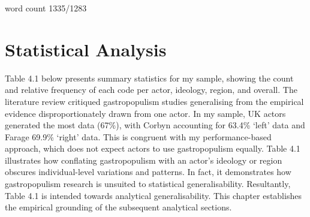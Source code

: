 \documentclass[a4paper, nobind]{templates/ociamthesis}
\begin{document}
\begin{romanpages}







\dominitoc %

\flushbottom




\end{romanpages}

\flushbottom

{word count 1335/1283}

\hypertarget{statistical-analysis}{%
\chapter{Statistical Analysis}\label{statistical-analysis}}

Table 4.1 below presents summary statistics for my sample, showing the count and relative frequency of each code per actor, ideology, region, and overall. The literature review critiqued gastropopulism studies generalising from the empirical evidence disproportionately drawn from one actor. In my sample, UK actors generated the most data (67\%), with Corbyn accounting for 63.4\% `left' data and Farage 69.9\% `right' data. This is congruent with my performance-based approach, which does not expect actors to use gastropopulism equally. Table 4.1 illustrates how conflating gastropopulism with an actor's ideology or region obscures individual-level variations and patterns. In fact, it demonstrates how gastropopulism research is unsuited to statistical generalisability. Resultantly, Table 4.1 is intended towards analytical generalisability. This chapter establishes the empirical grounding of the subsequent analytical sections.
\end{document}
